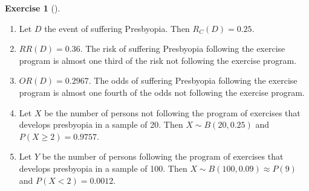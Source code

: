 \documentclass[
  a4paper,
]{scrreport}
\theoremstyle{definition}
\newtheorem{exercise}{Exercise}[chapter]
\theoremstyle{remark}
\begin{document}
\begin{exercise}[]
\begin{tcolorbox}
\begin{enumerate}
\def\labelenumi{\alph{enumi}.}
\item
  Let \(D\) the event of suffering Presbyopia. Then \(R_C(D) = 0.25\).
\item
  \(RR(D) = 0.36\). The risk of suffering Presbyopia following the
  exercise program is almost one third of the risk not following the
  exercise program.
\item
  \(OR(D) = 0.2967\). The odds of suffering Presbyopia following the
  exercise program is almost one fourth of the odds not following the
  exercise program.
\item
  Let \(X\) be the number of persons not following the program of
  exercises that develops presbyopia in a sample of 20. Then
  \(X\sim B(20, 0.25)\) and \(P(X\geq 2) = 0.9757\).
\item
  Let \(Y\) be the number of persons following the program of exercises
  that develops presbyopia in a sample of 100. Then
  \(X\sim B(100, 0.09)\approx P(9)\) and \(P(X< 2) = 0.0012\).
\end{enumerate}

\end{tcolorbox}

\end{exercise}
\end{document}
